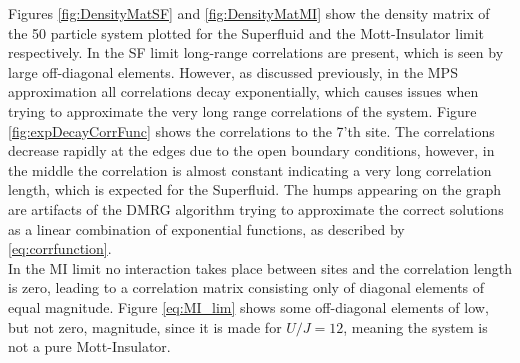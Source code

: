 Figures \ref{fig:DensityMatSF} and \ref{fig:DensityMatMI} show the density matrix of the 50 particle system plotted for the Superfluid and the Mott-Insulator limit respectively. In the SF limit long-range correlations are present, which is seen by large off-diagonal elements. However, as discussed previously, in the MPS approximation all correlations decay exponentially, which causes issues when trying to approximate the very long range correlations of the system. Figure \ref{fig:expDecayCorrFunc} shows the correlations to the 7'th site. The correlations decrease rapidly at the edges due to the open boundary conditions, however, in the middle the correlation is almost constant indicating a very long correlation length, which is expected for the Superfluid. The humps appearing on the graph are artifacts of the DMRG algorithm trying to approximate the correct solutions as a linear combination of exponential functions, as described by \ref{eq:corrfunction}.\\
In the MI limit no interaction takes place between sites and the correlation length is zero,  leading to a correlation matrix consisting only of diagonal elements of equal magnitude. Figure \ref{eq:MI_lim} shows some off-diagonal elements of low, but not zero, magnitude, since it is made for $U/J = 12$, meaning the system is not a pure Mott-Insulator.